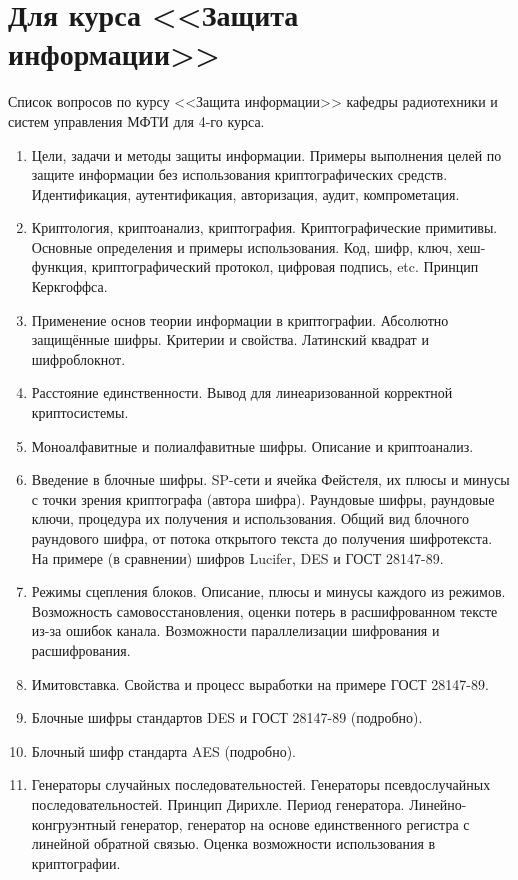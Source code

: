\section{Для курса <<Защита информации>>}

Список вопросов по курсу <<Защита информации>> кафедры радиотехники и систем управления МФТИ для 4-го курса.

\begin{enumerate}
    \item Цели, задачи и методы защиты информации. Примеры выполнения целей по защите информации без использования криптографических средств. Идентификация, аутентификация, авторизация, аудит, компрометация.
    \item Криптология, криптоанализ, криптография. Криптографические примитивы. Основные определения и примеры использования. Код, шифр, ключ, хеш-функция, криптографический протокол, цифровая подпись, etc. Принцип Керкгоффса.
    \item Применение основ теории информации в криптографии. Абсолютно защищённые шифры. Критерии и свойства. Латинский квадрат и шифроблокнот.
    \item Расстояние единственности. Вывод для линеаризованной корректной криптосистемы.
    \item Моноалфавитные и полиалфавитные шифры. Описание и криптоанализ.
    \item Введение в блочные шифры. SP-сети и ячейка Фейстеля, их плюсы и минусы с точки зрения криптографа (автора шифра). Раундовые шифры, раундовые ключи, процедура их получения и использования. Общий вид блочного раундового шифра, от потока открытого текста до получения шифротекста. На примере (в сравнении) шифров Lucifer, DES и ГОСТ 28147-89.
    \item Режимы сцепления блоков. Описание, плюсы и минусы каждого из режимов. Возможность самовосстановления, оценки потерь в расшифрованном тексте из-за ошибок канала. Возможности параллелизации шифрования и расшифрования.
    \item Имитовставка. Свойства и процесс выработки на примере ГОСТ 28147-89.
    \item Блочные шифры стандартов DES и ГОСТ 28147-89 (подробно).
    \item Блочный шифр стандарта AES (подробно).
    \item Генераторы случайных последовательностей. Генераторы псевдослучайных последовательностей. Принцип Дирихле. Период генератора. Линейно-конгруэнтный генератор, генератор на основе единственного регистра с линейной обратной связью. Оценка возможности использования в криптографии.

\end{enumerate}
